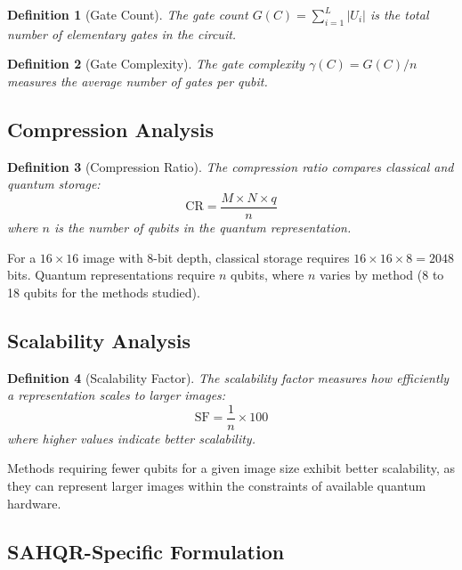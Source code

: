\documentclass{ipol}
\newtheorem{definition}{Definition}
\begin{document}
\begin{definition}[Gate Count]
The gate count $G(C) = \sum_{i=1}^{L} |U_i|$ is the total number of elementary gates in the circuit.
\end{definition}

\begin{definition}[Gate Complexity]
The gate complexity $\gamma(C) = G(C) / n$ measures the average number of gates per qubit.
\end{definition}

\subsection{Compression Analysis}

\begin{definition}[Compression Ratio]
The compression ratio compares classical and quantum storage:
\begin{equation}
\text{CR} = \frac{M \times N \times q}{n}
\label{eq:compression}
\end{equation}
where $n$ is the number of qubits in the quantum representation.
\end{definition}

For a $16 \times 16$ image with 8-bit depth, classical storage requires $16 \times 16 \times 8 = 2048$ bits. Quantum representations require $n$ qubits, where $n$ varies by method (8 to 18 qubits for the methods studied).

\subsection{Scalability Analysis}

\begin{definition}[Scalability Factor]
The scalability factor measures how efficiently a representation scales to larger images:
\begin{equation}
\text{SF} = \frac{1}{n} \times 100
\label{eq:scalability}
\end{equation}
where higher values indicate better scalability.
\end{definition}

Methods requiring fewer qubits for a given image size exhibit better scalability, as they can represent larger images within the constraints of available quantum hardware.

\subsection{SAHQR-Specific Formulation}
\end{document}
